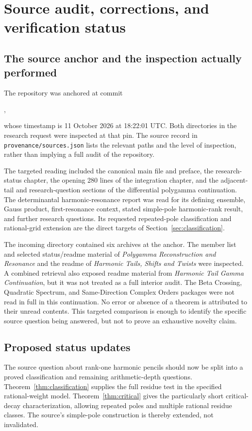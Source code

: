 \section{Source audit, corrections, and verification status}
\label{sec:audit}

\subsection{The source anchor and the inspection actually performed}
The repository was anchored at commit
\begin{center}\pin,\end{center}
whose timestamp is 11 October 2026 at 18:22:01 UTC. Both directories in
the research request were inspected at that pin. The source record in
\texttt{provenance/sources.json} lists the relevant paths and the level of
inspection, rather than implying a full audit of the repository.

The targeted reading included the canonical main file and preface, the
research-status chapter, the opening 280 lines of the integration chapter,
and the adjacent-tail and research-question sections of the differential
polygamma continuation. The determinantal harmonic-resonance report was
read for its defining ensemble, Gauss product, first-resonance context,
stated simple-pole harmonic-rank result, and further research questions.
Its requested repeated-pole classification and rational-grid extension
are the direct targets of Section~\ref{sec:classification}.

The incoming directory contained six archives at the anchor. The member
list and selected status/readme material of
\emph{Polygamma Reconstruction and Resonance} and the readme of
\emph{Harmonic Tails, Shifts and Twists} were inspected. A combined retrieval
also exposed readme material from \emph{Harmonic Tail Gamma Continuation},
but it was not treated as a full interior audit. The Beta Crossing,
Quadratic Spectrum, and Same-Direction Complex Orders packages were not
read in full in this continuation. No error or absence of a theorem is
attributed to their unread contents. This targeted comparison is enough
to identify the specific source question being answered, but not to prove
an exhaustive novelty claim.

\subsection{Proposed status updates}
The source question about rank-one harmonic pencils should now be split
into a proved classification and remaining arithmetic-depth questions.
Theorem~\ref{thm:classification} supplies the full residue test in the
specified rational-weight model. Theorem~\ref{thm:critical} gives the
particularly short critical-decay characterization, allowing repeated
poles and multiple rational residue classes. The source's simple-pole
construction is thereby extended, not invalidated.

